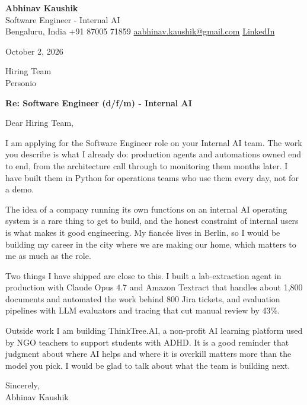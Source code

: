 \documentclass[11pt,a4paper]{article}
\begin{document}
{\Large\bfseries Abhinav Kaushik}\\
Software Engineer - Internal AI\\
Bengaluru, India \textbar{} +91 87005 71859 \textbar{} \href{mailto:aabhinav.kaushik@gmail.com}{aabhinav.kaushik@gmail.com} \textbar{} \href{https://www.linkedin.com/in/abhinav-kaushik10/}{LinkedIn}  

October 2, 2026

Hiring Team\\
Personio

\textbf{Re: Software Engineer (d/f/m) - Internal AI}

Dear Hiring Team,

I am applying for the Software Engineer role on your Internal AI team. The work you describe is what I already do: production agents and automations owned end to end, from the architecture call through to monitoring them months later. I have built them in Python for operations teams who use them every day, not for a demo.

The idea of a company running its own functions on an internal AI operating system is a rare thing to get to build, and the honest constraint of internal users is what makes it good engineering. My fiancée lives in Berlin, so I would be building my career in the city where we are making our home, which matters to me as much as the role.

Two things I have shipped are close to this. I built a lab-extraction agent in production with Claude Opus 4.7 and Amazon Textract that handles about 1,800 documents and automated the work behind 800 Jira tickets, and evaluation pipelines with LLM evaluators and tracing that cut manual review by 43\%.

Outside work I am building ThinkTree.AI, a non-profit AI learning platform used by NGO teachers to support students with ADHD. It is a good reminder that judgment about where AI helps and where it is overkill matters more than the model you pick. I would be glad to talk about what the team is building next.

Sincerely,\\[4pt]
Abhinav Kaushik
\end{document}
